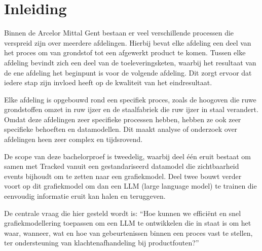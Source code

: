 


% 

\section{Inleiding}%
\label{sec:inleiding}
Binnen de Arcelor Mittal Gent bestaan er veel verschillende processen die verspreid zijn over meerdere afdelingen.
Hierbij bevat elke afdeling een deel van het proces om van grondstof tot een afgewerkt product te komen. 
Tussen elke afdeling bevindt zich een deel van de toeleveringsketen, waarbij het resultaat van de ene afdeling het beginpunt is voor de volgende afdeling.
Dit zorgt ervoor dat iedere stap zijn invloed heeft op de kwaliteit van het eindresultaat.

Elke afdeling is opgebouwd rond een specifiek proces, zoals de hoogoven die ruwe grondstoffen omzet in ruw ijzer en de staalfabriek die ruw ijzer in staal verandert.
Omdat deze afdelingen zeer specifieke processen hebben, hebben ze ook zeer specifieke behoeften en datamodellen.
Dit maakt analyse of onderzoek over afdelingen heen zeer complex en tijdsrovend.

De scope van deze bachelorproef is tweedelig, waarbij deel één eruit bestaat om samen met Tracked vanuit een gestandariseerd datamodel die zichtbaarheid events bijhoudt om te zetten naar een grafiekmodel.
Deel twee bouwt verder voort op dit grafiekmodel om dan een LLM (large language model) te trainen die eenvoudig informatie eruit kan halen en teruggeven.

De centrale vraag die hier gesteld wordt is: \enquote{Hoe kunnen we efficiënt en snel grafiekmodellering toepassen om een LLM te ontwikkelen die in staat is om het waar, wanneer, wat en hoe van gebeurtenissen binnen een proces vast te stellen, ter ondersteuning van klachtenafhandeling bij productfouten?}

